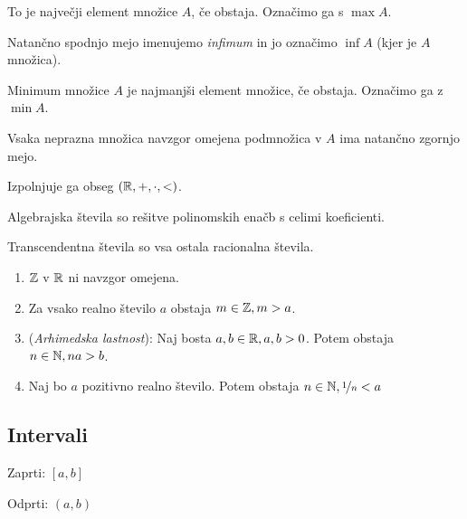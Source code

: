 
To je največji element množice $A$, če obstaja. Označimo ga s $\max A$.


Natančno spodnjo mejo imenujemo \textit{infimum} in jo označimo $\inf A$ (kjer je $A$ množica).

Minimum množice $A$ je najmanjši element množice, če obstaja. Označimo ga z $\min A$.


Vsaka neprazna množica navzgor omejena podmnožica v $A$ ima natančno zgornjo mejo.

Izpolnjuje ga obseg $(\mathbb{R}, +, \cdot, <)$.


Algebrajska števila so rešitve polinomskih enačb s celimi koeficienti.

Transcendentna števila so vsa ostala racionalna števila.


\begin{enumerate}
	\item $\mathbb{Z}$ v $\mathbb{R}$ ni navzgor omejena.
	\item Za vsako realno število $a$ obstaja $m \in \mathbb{Z}, m > a$.
	\item (\textit{Arhimedska lastnost}): Naj bosta $a, b \in \mathbb{R}, a, b > 0$. Potem obstaja $n \in \mathbb{N}, na > b$.
	\item Naj bo $a$ pozitivno realno število. Potem obstaja $n \in \mathbb{N}, \nicefrac{1}{n} < a$
\end{enumerate}

\subsection{Intervali}


Zaprti: $[a, b]$

Odprti: $(a, b)$